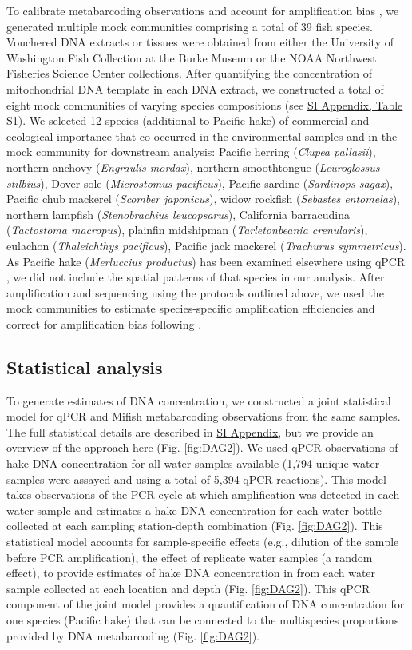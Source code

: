\documentclass{article}
\begin{document}
To calibrate metabarcoding observations and account for amplification bias \cite{shelton2023,gold2023}, we generated multiple mock communities comprising a total of 39 fish species. Vouchered DNA extracts or tissues were obtained from either the University of Washington Fish Collection at the Burke Museum or the NOAA Northwest Fisheries Science Center collections. After quantifying the concentration of mitochondrial DNA template in each DNA extract, we constructed a total of eight mock communities of varying species compositions (see \href{SI_Appendix.pdf}{SI Appendix, Table S1}). We selected 12 species (additional to Pacific hake) of commercial and ecological importance that co-occurred in the environmental samples and in the mock community for downstream analysis: Pacific herring (\textit{Clupea pallasii}), northern anchovy (\textit{Engraulis mordax}), northern smoothtongue (\textit{Leuroglossus stilbius}), Dover sole (\textit{Microstomus pacificus}), Pacific sardine (\textit{Sardinops sagax}), Pacific chub mackerel (\textit{Scomber japonicus}), widow rockfish (\textit{Sebastes entomelas}), northern lampfish (\textit{Stenobrachius leucopsarus}), California barracudina (\textit{Tactostoma macropus}), plainfin midshipman (\textit{Tarletonbeania crenularis}), eulachon (\textit{Thaleichthys pacificus}), Pacific jack mackerel (\textit{Trachurus symmetricus}). As Pacific hake (\textit{Merluccius productus}) has been examined elsewhere using qPCR \cite{shelton2022}, we did not include the spatial patterns of that species in our analysis. After amplification and sequencing using the protocols outlined above, we used the mock communities to estimate species-specific amplification efficiencies and correct for amplification bias following \cite{shelton2023}.

\subsection*{Statistical analysis}
To generate estimates of DNA concentration, we constructed a joint statistical model for qPCR and Mifish metabarcoding observations from the same samples. The full statistical details are described in \href{SI_Appendix.pdf}{SI Appendix}, but we provide an overview of the approach here (Fig. \ref{fig:DAG2}). We used qPCR observations of hake DNA concentration for all water samples available (1,794 unique water samples were assayed and using a total of 5,394 qPCR reactions). This model takes observations of the PCR cycle at which amplification was detected in each water sample and estimates a hake DNA concentration for each water bottle collected at each sampling station-depth combination (Fig. \ref{fig:DAG2}). This statistical model accounts for sample-specific effects (e.g., dilution of the sample before PCR amplification), the effect of replicate water samples (a random effect), to provide estimates of hake DNA concentration in from each water sample collected at each location and depth (Fig. \ref{fig:DAG2}). This qPCR component of the joint model provides a quantification of DNA concentration for one species (Pacific hake) that can be connected to the multispecies proportions provided by DNA metabarcoding (Fig. \ref{fig:DAG2}).
\end{document}
